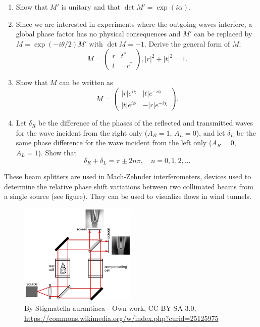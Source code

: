 \documentclass[letterpaper,11pt]{article}
\begin{document}
\begin{enumerate}
  \begin{enumerate}
    \item Show that $M'$ is unitary and that $\det M' = \exp(i\alpha)$.
    \item Since we are interested in experiments where the outgoing waves interfere, a global phase factor has no physical consequences and $M'$ can be replaced by $M = \exp(-i\theta/2)M'$ with $\det M = -1$. Derive the general form of $M$:
    $$ M = \left( \begin{array}{cc} r & t^* \\ t & -r^* \end{array} \right), |r|^2 + |t|^2 = 1. $$
    \item Show that $M$ can be written as
    $$ M = \left( \begin{array}{cc} |r|e^{i\chi} & |t|e^{-i\phi} \\ |t|e^{i\phi} & -|r|e^{-i\chi} \end{array} \right). $$
    \item Let $\delta_R$ be the difference of the phases of the reflected and transmitted waves for the wave incident from the right only ($A_R = 1$, $A_L = 0$), and let $\delta_L$ be the same phase difference for the wave incident from the left only ($A_R = 0$, $A_L = 1$). Show that
    $$ \delta_R + \delta_L = \pi \pm 2 n \pi, \quad n = 0,1,2,\ldots $$
  \end{enumerate}
 These beam splitters are used in Mach-Zehnder interferometers, devices used to determine the relative phase shift variations between two collimated beams from a single source (see figure). They can be used to visualize flows in wind tunnels.
 \begin{figure}
   \begin{center}
     \includegraphics[width=0.5\textwidth]{images/Mach_Zehnder_interferometer}
   \end{center}
   \caption{By Stigmatella aurantiaca - Own work, CC BY-SA 3.0, \url{https://commons.wikimedia.org/w/index.php?curid=25125975}}

\end{figure}
\end{enumerate}
\end{document}

